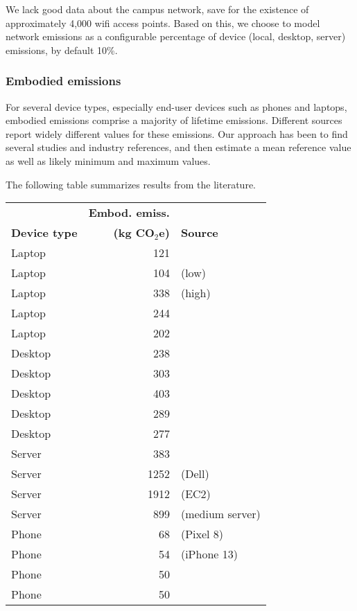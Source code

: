 \documentclass[11pt]{article}
\newcommand{\coe}{CO$_2$e}
\newcommand{\gcoe}{g \coe}
\newcommand{\kgcoe}{k\gcoe}
\begin{document}
We lack good data about the campus network, save for the existence of approximately 4,000 wifi access points. Based on this, we choose to model network emissions as a configurable percentage of device (local, desktop, server) emissions, by default 10\%.

\subsubsection*{Embodied emissions}

For several device types, especially end-user devices such as phones and laptops, embodied emissions
comprise a majority of lifetime emissions. Different sources report widely different values for these emissions. Our approach has been to find several studies and industry references, and then estimate a mean reference value as well as likely minimum and maximum values.

The following table summarizes results from the literature.

\begin{center}
  \begin{tabular}{|l|r|l|}
    \hline
    & \textbf{Embod. emiss.} & \\
    \textbf{Device type} & \textbf{(\kgcoe)} & \textbf{Source} \\ \hline
    Laptop & 121 & \textcite{ecoinvent}  \\ \hline
    Laptop & 104 & \textcite{teehan2013} (low) \\ \hline
    Laptop & 338 & \textcite{teehan2013} (high) \\ \hline
    Laptop & 244 & \textcite{rarecoil} \\ \hline
    Laptop & 202 & \textcite{unctadder2024} \\ \hline
    Desktop & 238 & \textcite{ecoinvent} \\ \hline
    Desktop & 303 & \textcite{teehan2013} \\ \hline
    Desktop & 403 & \textcite{unctadder2024} \\ \hline
    Desktop & 289 & \textcite{dellpcf} \\ \hline
    Desktop & 277 & \textcite{boavizta:api} \\ \hline
    Server & 383 & \textcite{teehan2013} \\ \hline
    Server & 1252 & \textcite{davy2021} (Dell) \\ \hline
    Server & 1912 & \textcite{davy2021} (EC2) \\ \hline
    Server & 899 & \textcite{boavizta:api} (medium server)\\ \hline
    Phone & 68 & \textcite{googlepixel8} (Pixel 8)\\ \hline
    Phone & 54 & \textcite{appleiphone13} (iPhone 13)\\ \hline
    Phone & 50 & \textcite{unctadder2024} \\ \hline
    Phone & 50 & \textcite{lovehagen2023} \\ \hline
    \end{tabular}
  \label{tab:embodied_emissions}
\end{center}
\end{document}

